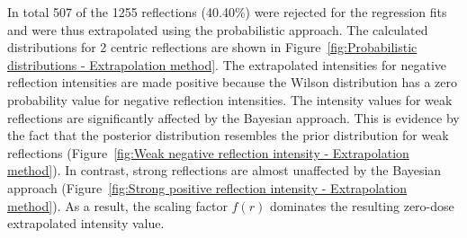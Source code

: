 In total 507 of the 1255 reflections (40.40\%) were rejected for the regression fits and were thus extrapolated using the probabilistic approach.
The calculated distributions for 2 centric reflections are shown in Figure~\ref{fig:Probabilistic distributions - Extrapolation method}.
The extrapolated intensities for negative reflection intensities are made positive because the Wilson distribution has a zero probability value for negative reflection intensities.
The intensity values for weak reflections are significantly affected by the Bayesian approach.
This is evidence by the fact that the posterior distribution resembles the prior distribution for weak reflections (Figure~\ref{fig:Weak negative reflection intensity - Extrapolation method}).
In contrast, strong reflections are almost unaffected by the Bayesian approach (Figure~\ref{fig:Strong positive reflection intensity - Extrapolation method}).
As a result, the scaling factor $f(r)$ dominates the resulting zero-dose extrapolated intensity value.
